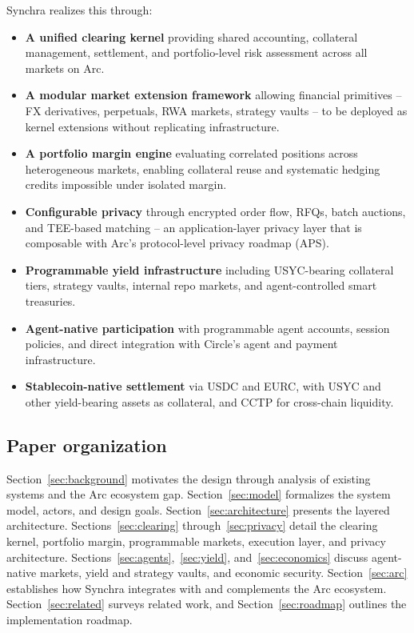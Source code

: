\documentclass[11pt,a4paper]{article}
\begin{document}
Synchra realizes this through:

\begin{itemize}
  \item \textbf{A unified clearing kernel} providing shared accounting, collateral management, settlement, and portfolio-level risk assessment across all markets on Arc.
  \item \textbf{A modular market extension framework} allowing financial primitives -- FX derivatives, perpetuals, RWA markets, strategy vaults -- to be deployed as kernel extensions without replicating infrastructure.
  \item \textbf{A portfolio margin engine} evaluating correlated positions across heterogeneous markets, enabling collateral reuse and systematic hedging credits impossible under isolated margin.
  \item \textbf{Configurable privacy} through encrypted order flow, RFQs, batch auctions, and TEE-based matching -- an application-layer privacy layer that is composable with Arc's protocol-level privacy roadmap (APS).
  \item \textbf{Programmable yield infrastructure} including USYC-bearing collateral tiers, strategy vaults, internal repo markets, and agent-controlled smart treasuries.
  \item \textbf{Agent-native participation} with programmable agent accounts, session policies, and direct integration with Circle's agent and payment infrastructure.
  \item \textbf{Stablecoin-native settlement} via USDC and EURC, with USYC and other yield-bearing assets as collateral, and CCTP for cross-chain liquidity.
\end{itemize}

\subsection{Paper organization}

Section~\ref{sec:background} motivates the design through analysis of existing systems and the Arc ecosystem gap. Section~\ref{sec:model} formalizes the system model, actors, and design goals. Section~\ref{sec:architecture} presents the layered architecture. Sections~\ref{sec:clearing} through~\ref{sec:privacy} detail the clearing kernel, portfolio margin, programmable markets, execution layer, and privacy architecture. Sections~\ref{sec:agents},~\ref{sec:yield}, and~\ref{sec:economics} discuss agent-native markets, yield and strategy vaults, and economic security. Section~\ref{sec:arc} establishes how Synchra integrates with and complements the Arc ecosystem. Section~\ref{sec:related} surveys related work, and Section~\ref{sec:roadmap} outlines the implementation roadmap.
\end{document}
